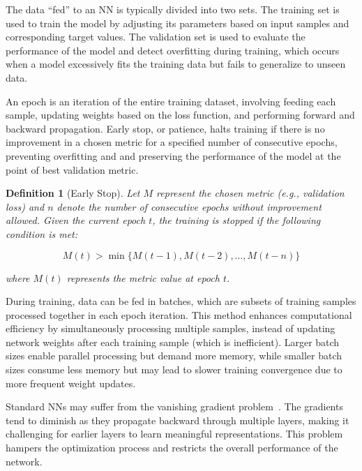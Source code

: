 \documentclass[ppgc,diss,english]{iiufrgs}
\newtheorem{definition}{Definition}
\begin{document}
The data ``fed'' to an NN is typically divided into two sets. The training set is used to train the model by adjusting its parameters based on input samples and corresponding target values. The validation set is used to evaluate the performance of the model and detect overfitting during training, which occurs when a model excessively fits the training data but fails to generalize to unseen data.

An epoch is an iteration of the entire training dataset, involving feeding each sample, updating weights based on the loss function, and performing forward and backward propagation.
Early stop, or patience, halts training if there is no improvement in a chosen metric for a specified number of consecutive epochs, preventing overfitting and and preserving the performance of the model at the point of best validation metric.

\begin{definition}[Early Stop]
Let $M$ represent the chosen metric (e.g., validation loss) and $n$ denote the number of consecutive epochs without improvement allowed. Given the current epoch $t$, the training is stopped if the following condition is met:

$$M(t) > \min\{M(t-1), M(t-2), \ldots, M(t-n)\}$$

where $M(t)$ represents the metric value at epoch $t$.
\end{definition}

During training, data can be fed in batches, which are subsets of training samples processed together in each epoch iteration. This method enhances computational efficiency by simultaneously processing multiple samples, instead of updating network weights after each training sample (which is inefficient). Larger batch sizes enable parallel processing but demand more memory, while smaller batch sizes consume less memory but may lead to slower training convergence due to more frequent weight updates.

Standard NNs may suffer from the vanishing gradient problem~\cite{Hochreiter/1991}. The gradients tend to diminish as they propagate backward through multiple layers, making it challenging for earlier layers to learn meaningful representations. This problem hampers the optimization process and restricts the overall performance of the network.
\end{document}
